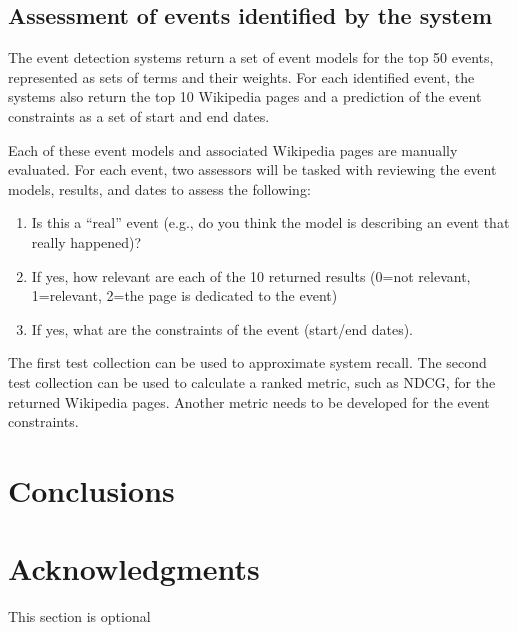 \documentclass{sig-alternate}
\begin{document}
\subsection{Assessment of events identified by the system}

The event detection systems return a set of event models for the top 50 events, represented as sets of terms and their weights. For each identified event, the systems also return the top 10 Wikipedia pages and a prediction of the event constraints as a set of start and end dates.

Each of these event models and associated Wikipedia pages are manually evaluated. For each event, two assessors will be tasked with reviewing the event models, results, and dates to assess the following:
\begin{enumerate}
\item Is this a ``real'' event (e.g., do you think the model is describing an event that really happened)?
\item If yes, how relevant are each of the 10 returned results (0=not relevant, 1=relevant, 2=the page is dedicated to the event)
\item If yes, what are the constraints of the event (start/end dates).
\end{enumerate}

The first test collection can be used to approximate system recall.  The second test collection can be used to calculate a ranked metric, such as NDCG, for the returned Wikipedia pages. Another metric needs to be developed for the event constraints.

\section{Conclusions}


\section{Acknowledgments}
This section is optional

%



  

\appendix
\end{document}
